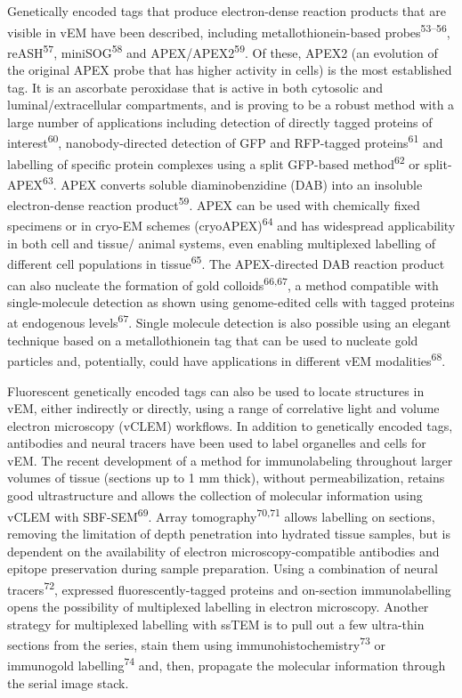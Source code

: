 \documentclass{article}
\begin{document}
Genetically encoded tags that produce electron-dense reaction products that are visible in vEM have been described, including metallothionein-based probes\textsuperscript{53–56}, reASH\textsuperscript{57}, miniSOG\textsuperscript{58} and APEX/APEX2\textsuperscript{59}. Of these, APEX2 (an evolution of the original APEX probe that has higher activity in cells) is the most established tag. It is an ascorbate peroxidase that is active in both cytosolic and luminal/extracellular compartments, and is proving to be a robust method with a large number of applications including detection of directly tagged proteins of interest\textsuperscript{60}, nanobody-directed detection of GFP and RFP-tagged proteins\textsuperscript{61} and labelling of specific protein complexes using a split GFP-based method\textsuperscript{62} or split-APEX\textsuperscript{63}. APEX converts soluble diaminobenzidine (DAB) into an insoluble electron-dense reaction product\textsuperscript{59}. APEX can be used with chemically fixed specimens or in cryo-EM schemes (cryoAPEX)\textsuperscript{64} and has widespread applicability in both cell and tissue/ animal systems, even enabling multiplexed labelling of different cell populations in tissue\textsuperscript{65}. The APEX-directed DAB reaction product can also nucleate the formation of gold colloids\textsuperscript{66,67}, a method compatible with single-molecule detection as shown using genome-edited cells with tagged proteins at endogenous levels\textsuperscript{67}. Single molecule detection is also possible using an elegant technique based on a metallothionein tag that can be used to nucleate gold particles and, potentially, could have applications in different vEM modalities\textsuperscript{68}.

Fluorescent genetically encoded tags can also be used to locate structures in vEM, either indirectly or directly, using a range of correlative light and volume electron microscopy (vCLEM) workflows. In addition to genetically encoded tags, antibodies and neural tracers have been used to label organelles and cells for vEM. The recent development of a method for immunolabeling throughout larger volumes of tissue (sections up to 1 mm thick), without permeabilization, retains good ultrastructure and allows the collection of molecular information using vCLEM with SBF-SEM\textsuperscript{69}. Array tomography\textsuperscript{70,71} allows labelling on sections, removing the limitation of depth penetration into hydrated tissue samples, but is dependent on the availability of electron microscopy-compatible antibodies and epitope preservation during sample preparation. Using a combination of neural tracers\textsuperscript{72}, expressed fluorescently-tagged proteins and on-section immunolabelling opens the possibility of multiplexed labelling in electron microscopy. Another strategy for multiplexed labelling with ssTEM is to pull out a few ultra-thin sections from the series, stain them using immunohistochemistry\textsuperscript{73} or immunogold labelling\textsuperscript{74} and, then, propagate the molecular information through the serial image stack.
\end{document}
